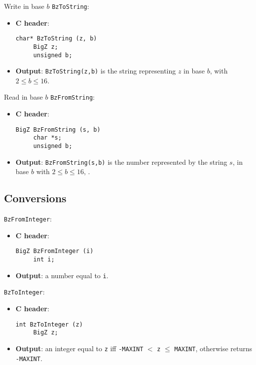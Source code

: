 \begin{func} Write in base $b$  \verb+BzToString+:
\begin{itemize}
  \item{\bf C header}:
\begin{verbatim}
char* BzToString (z, b)
     BigZ z;
     unsigned b;
\end{verbatim}
  \item{\bf Output}: \verb+BzToString(z,b)+ is the string representing
$z$ in base $b$, with $2 \leq b \leq 16$.
\end{itemize}
\end{func}

 
\begin{func} Read in base $b$  \verb+BzFromString+:
\begin{itemize}
  \item{\bf C header}:
\begin{verbatim}
BigZ BzFromString (s, b)
     char *s;
     unsigned b;
\end{verbatim}
  \item{\bf Output}: \verb+BzFromString(s,b)+ is the number represented
by the string $s$, in base $b$ with $2 \leq b \leq 16$, .
\end{itemize}
\end{func}

\subsection{Conversions}

\begin{func}  \verb+BzFromInteger+:
\begin{itemize}
  \item{\bf C header}:
\begin{verbatim}
BigZ BzFromInteger (i)    
     int i;
\end{verbatim}
  \item{\bf Output}: a number equal to \verb/i/.
\end{itemize}
\end{func}


\begin{func}  \verb+BzToInteger+:
\begin{itemize}
  \item{\bf C header}:
\begin{verbatim}
int BzToInteger (z)    
     BigZ z;
\end{verbatim}
  \item{\bf Output}: an integer equal to \verb/z/ 
   iff \verb/-MAXINT/ $<$ \verb/z/ $\leq$ \verb/MAXINT/,
                    otherwise returns \verb/-MAXINT/.
\end{itemize}
\end{func}


